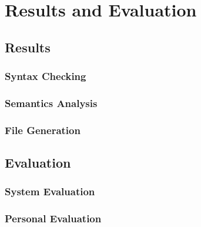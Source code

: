\documentclass[report.tex]{subfiles}
\begin{document}
\chapter{Results and Evaluation} %
\label{cha:results_and_evaluation}

\section{Results} %
\label{sec:results}
\subsection{Syntax Checking} %
\label{sub:syntax_checking}


\subsection{Semantics Analysis} %
\label{sub:semantics_analysis}


\subsection{File Generation} %
\label{sub:file_generation}


\section{Evaluation} %
\label{sec:evaluation}
\subsection{System Evaluation} %
\label{sub:system_evaluation}


\subsection{Personal Evaluation} %
\label{sub:personal_evaluation}


\newpage
\end{document}

